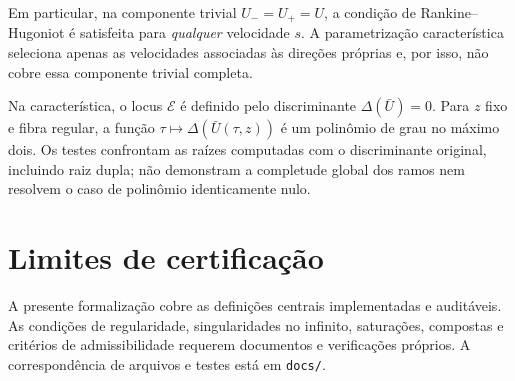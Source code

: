 \documentclass[11pt,a4paper]{article}
\begin{document}
Em particular, na componente trivial $U_-=U_+=U$, a condição de
Rankine--Hugoniot é satisfeita para \emph{qualquer} velocidade $s$.
A parametrização característica seleciona apenas as velocidades
associadas às direções próprias e, por isso, não cobre essa componente
trivial completa.

Na característica, o locus $\mathcal E$ é definido pelo discriminante
$\Delta(\bar U)=0$. Para $z$ fixo e fibra regular, a função
$\tau\mapsto\Delta(\bar U(\tau,z))$ é um polinômio de grau no máximo dois.
Os testes confrontam as raízes computadas com o discriminante original,
incluindo raiz dupla; não demonstram a completude global dos ramos
nem resolvem o caso de polinômio identicamente nulo.

\section{Limites de certificação}
A presente formalização cobre as definições centrais implementadas e auditáveis. As condições de regularidade, singularidades no infinito, saturações, compostas e critérios de admissibilidade requerem documentos e verificações próprios. A correspondência de arquivos e testes está em \texttt{docs/}.
\end{document}
